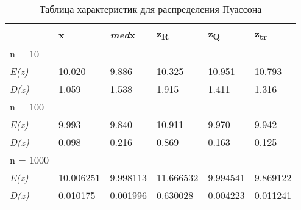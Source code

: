 \begin{table}[H]
    \centering
   
    \begin{tabular}{|l|l|l|l|l|l|}
    \hline
         &  x &   \textit{med}x   &   z\textsubscript{R}  &   z\textsubscript{Q}  &   z\textsubscript{tr}\\ \hline \hline
         n = 10& & & & & \\ \hline
         \textit{E(z)} &  10.020       &       9.886      &       10.325      &       10.951      &      10.793 \\ \hline
         \textit{D(z)} & 1.059     &      1.538      &    1.915     &       1.411      &      1.316 \\ \hline
       \hline
         n = 100& & & & & \\ \hline
         \textit{E(z)} & 9.993    &      9.840     &      10.911    &          9.970     &     9.942  \\ \hline
         \textit{D(z)} &  0.098   &     0.216    &      0.869    &      0.163      &       0.125 \\ \hline
        \hline
         n = 1000& & & & & \\ \hline
         \textit{E(z)} &  10.006251      &      9.998113       &     11.666532     &         9.994541      &       9.869122   \\ \hline
         \textit{D(z)} &  0.010175     &   0.001996    &     0.630028  &      0.004223      &   0.011241  \\ \hline
    \end{tabular}
     \caption{Таблица характеристик для распределения Пуассона}
    \label{tab:my_label}
\end{table}
